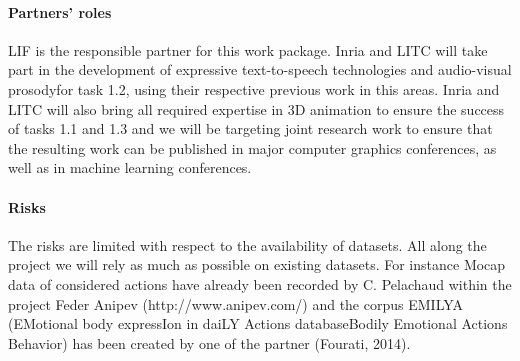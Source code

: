 \paragraph{Partners' roles}

LIF is the responsible partner for this work package. Inria and LITC will take part in the development of expressive text-to-speech technologies and audio-visual prosodyfor task 1.2, using their respective previous work in this areas. Inria and LITC will also bring all required expertise in 3D animation to ensure the success of  tasks 1.1 and 1.3 and we will be targeting joint research work to ensure that the resulting work can be published in major computer graphics conferences, as well as in machine learning conferences.

\paragraph{Risks}

The risks are limited with respect to the availability of datasets. All along the project we will rely as much as possible on existing datasets. For instance Mocap data of considered actions have already been recorded by C. Pelachaud within the project Feder Anipev (http://www.anipev.com/) and the corpus EMILYA (EMotional body expressIon in daiLY Actions databaseBodily Emotional Actions Behavior) has been created by one of the partner (Fourati, 2014).



\endinput